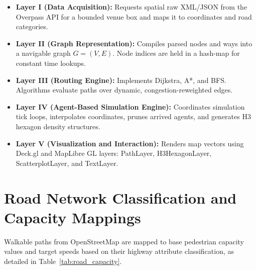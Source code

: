 \documentclass[12pt,a4paper,oneside]{report}
\begin{document}
\begin{itemize}
    \item \textbf{Layer I (Data Acquisition):} Requests spatial raw XML/JSON from the Overpass API for a bounded venue box and maps it to coordinates and road categories.
    \item \textbf{Layer II (Graph Representation):} Compiles parsed nodes and ways into a navigable graph $G=(V, E)$. Node indices are held in a hash-map for constant time lookups.
    \item \textbf{Layer III (Routing Engine):} Implements Dijkstra, A*, and BFS. Algorithms evaluate paths over dynamic, congestion-reweighted edges.
    \item \textbf{Layer IV (Agent-Based Simulation Engine):} Coordinates simulation tick loops, interpolates coordinates, prunes arrived agents, and generates H3 hexagon density structures.
    \item \textbf{Layer V (Visualization and Interaction):} Renders map vectors using Deck.gl and MapLibre GL layers: PathLayer, H3HexagonLayer, ScatterplotLayer, and TextLayer.
\end{itemize}

\section{Road Network Classification and Capacity Mappings}
Walkable paths from OpenStreetMap are mapped to base pedestrian capacity values and target speeds based on their highway attribute classification, as detailed in Table~\ref{tab:road_capacity}.

\begin{table}[H]
\centering
\caption{OpenStreetMap Highway Classification, Speeds, and Capacity System}
\label{tab:road_capacity}
\end{table}
\end{document}

